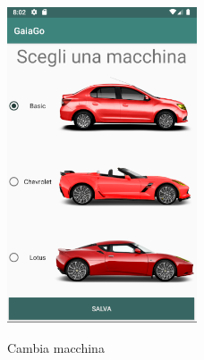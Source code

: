 \begin{itemize}
\begin{figure}[H]
	 	\includegraphics[width=0.5\textwidth]{res/images/minigame3.png}\\
	 	\caption{Cambia macchina}
	 	\label{minigame3}
	 \end{figure}
	 \pagebreak
	 
\end{itemize}




